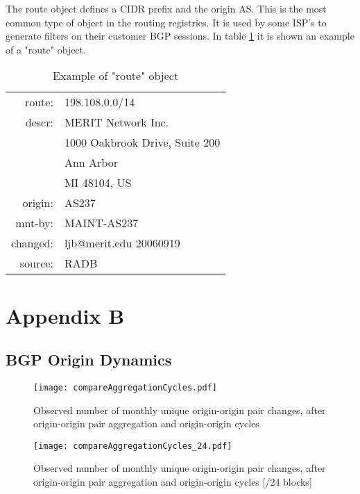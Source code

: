 \documentclass[11pt,a4paper]{scrreprt}
\begin{document}
The route object defines a CIDR prefix and the origin AS. This is the most common type of object in the routing registries. It is used by some ISP's to generate filters on their customer BGP sessions. In table \ref{table:6} it is shown an example of a "route" object. 	

\begin{table}[!h]
\centering
\begin{tabular}{  r  l  }

route:   	&      198.108.0.0/14\\
descr:    	&      MERIT Network Inc.\\
			&		1000 Oakbrook Drive, Suite 200\\ 
 			&		Ann Arbor \\
 			&		MI 48104, US\\
origin:    	&      AS237\\
mnt-by:    	&      MAINT-AS237\\
changed:   	&      ljb@merit.edu 20060919\\
source:   	&      RADB\\

\end{tabular}
\caption{Example of "route" object}
\label{table:6}
\end{table}

\chapter{Appendix B}

\section{BGP Origin Dynamics}

\begin{figure}[!h]
\centering
\texttt{[image: compareAggregationCycles.pdf]}
\caption{Observed number of monthly
unique origin-origin pair changes, after origin-origin pair aggregation and origin-origin cycles}
\label{fig:compareAggregationCycles}
\end{figure}


\begin{figure}[!h]
\centering
\texttt{[image: compareAggregationCycles\_24.pdf]}
\caption{Observed number of monthly
unique origin-origin pair changes, after origin-origin pair aggregation and origin-origin cycles [/24 blocks]}
\label{fig:compareAggregationCycles24}
\end{figure}
\end{document}
